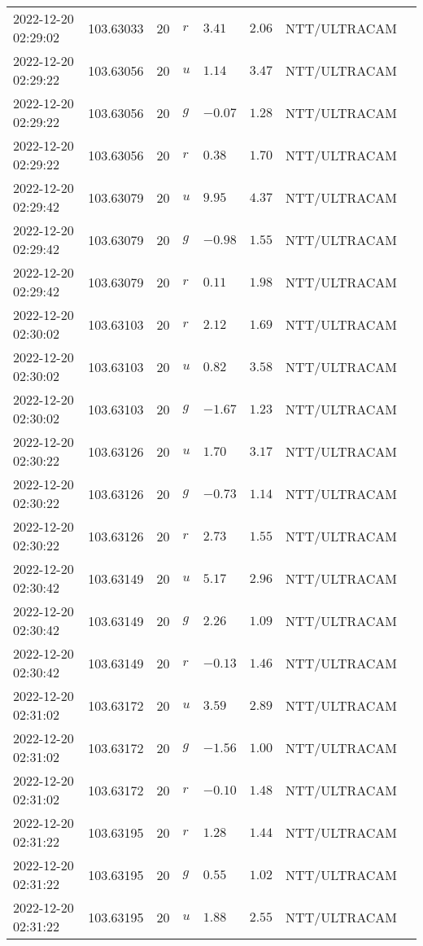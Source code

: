 \documentclass{nature_plusfigure}
\begin{document}
\begin{supplement}
\begin{center}
\begin{longtable}{llllllll}
2022-12-20 02:29:02 & 103.63033 & 20 & $r$ & $3.41$ & $2.06$ & NTT/ULTRACAM &  \\ 
2022-12-20 02:29:22 & 103.63056 & 20 & $u$ & $1.14$ & $3.47$ & NTT/ULTRACAM &  \\ 
2022-12-20 02:29:22 & 103.63056 & 20 & $g$ & $-0.07$ & $1.28$ & NTT/ULTRACAM &  \\ 
2022-12-20 02:29:22 & 103.63056 & 20 & $r$ & $0.38$ & $1.70$ & NTT/ULTRACAM &  \\ 
2022-12-20 02:29:42 & 103.63079 & 20 & $u$ & $9.95$ & $4.37$ & NTT/ULTRACAM &  \\ 
2022-12-20 02:29:42 & 103.63079 & 20 & $g$ & $-0.98$ & $1.55$ & NTT/ULTRACAM &  \\ 
2022-12-20 02:29:42 & 103.63079 & 20 & $r$ & $0.11$ & $1.98$ & NTT/ULTRACAM &  \\ 
2022-12-20 02:30:02 & 103.63103 & 20 & $r$ & $2.12$ & $1.69$ & NTT/ULTRACAM &  \\ 
2022-12-20 02:30:02 & 103.63103 & 20 & $u$ & $0.82$ & $3.58$ & NTT/ULTRACAM &  \\ 
2022-12-20 02:30:02 & 103.63103 & 20 & $g$ & $-1.67$ & $1.23$ & NTT/ULTRACAM &  \\ 
2022-12-20 02:30:22 & 103.63126 & 20 & $u$ & $1.70$ & $3.17$ & NTT/ULTRACAM &  \\ 
2022-12-20 02:30:22 & 103.63126 & 20 & $g$ & $-0.73$ & $1.14$ & NTT/ULTRACAM &  \\ 
2022-12-20 02:30:22 & 103.63126 & 20 & $r$ & $2.73$ & $1.55$ & NTT/ULTRACAM &  \\ 
2022-12-20 02:30:42 & 103.63149 & 20 & $u$ & $5.17$ & $2.96$ & NTT/ULTRACAM &  \\ 
2022-12-20 02:30:42 & 103.63149 & 20 & $g$ & $2.26$ & $1.09$ & NTT/ULTRACAM &  \\ 
2022-12-20 02:30:42 & 103.63149 & 20 & $r$ & $-0.13$ & $1.46$ & NTT/ULTRACAM &  \\ 
2022-12-20 02:31:02 & 103.63172 & 20 & $u$ & $3.59$ & $2.89$ & NTT/ULTRACAM &  \\ 
2022-12-20 02:31:02 & 103.63172 & 20 & $g$ & $-1.56$ & $1.00$ & NTT/ULTRACAM &  \\ 
2022-12-20 02:31:02 & 103.63172 & 20 & $r$ & $-0.10$ & $1.48$ & NTT/ULTRACAM &  \\ 
2022-12-20 02:31:22 & 103.63195 & 20 & $r$ & $1.28$ & $1.44$ & NTT/ULTRACAM &  \\ 
2022-12-20 02:31:22 & 103.63195 & 20 & $g$ & $0.55$ & $1.02$ & NTT/ULTRACAM &  \\ 
2022-12-20 02:31:22 & 103.63195 & 20 & $u$ & $1.88$ & $2.55$ & NTT/ULTRACAM &  \\ 

\end{longtable}
\end{center}
\end{supplement}
\end{document}
